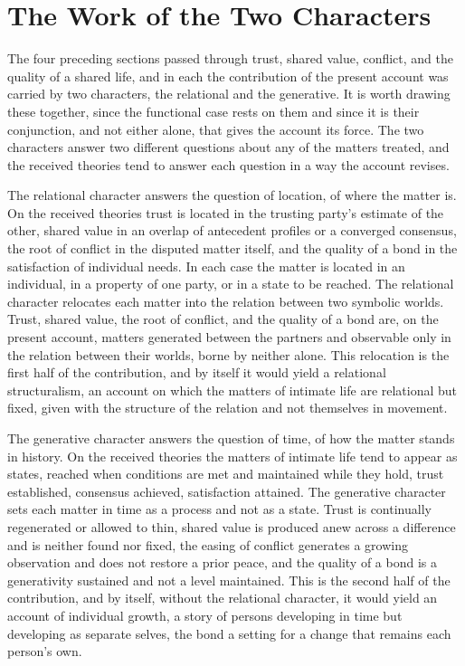 \section{The Work of the Two Characters}
\label{p27:sec:twocharacters}

\noindent
The four preceding sections passed through trust, shared value, conflict, and the quality of a shared life, and in each the contribution of the present account was carried by two characters, the relational and the generative. It is worth drawing these together, since the functional case rests on them and since it is their conjunction, and not either alone, that gives the account its force. The two characters answer two different questions about any of the matters treated, and the received theories tend to answer each question in a way the account revises.

The relational character answers the question of location, of where the matter is. On the received theories trust is located in the trusting party's estimate of the other, shared value in an overlap of antecedent profiles or a converged consensus, the root of conflict in the disputed matter itself, and the quality of a bond in the satisfaction of individual needs. In each case the matter is located in an individual, in a property of one party, or in a state to be reached. The relational character relocates each matter into the relation between two symbolic worlds. Trust, shared value, the root of conflict, and the quality of a bond are, on the present account, matters generated between the partners and observable only in the relation between their worlds, borne by neither alone. This relocation is the first half of the contribution, and by itself it would yield a relational structuralism, an account on which the matters of intimate life are relational but fixed, given with the structure of the relation and not themselves in movement.

The generative character answers the question of time, of how the matter stands in history. On the received theories the matters of intimate life tend to appear as states, reached when conditions are met and maintained while they hold, trust established, consensus achieved, satisfaction attained. The generative character sets each matter in time as a process and not as a state. Trust is continually regenerated or allowed to thin, shared value is produced anew across a difference and is neither found nor fixed, the easing of conflict generates a growing observation and does not restore a prior peace, and the quality of a bond is a generativity sustained and not a level maintained. This is the second half of the contribution, and by itself, without the relational character, it would yield an account of individual growth, a story of persons developing in time but developing as separate selves, the bond a setting for a change that remains each person's own.

